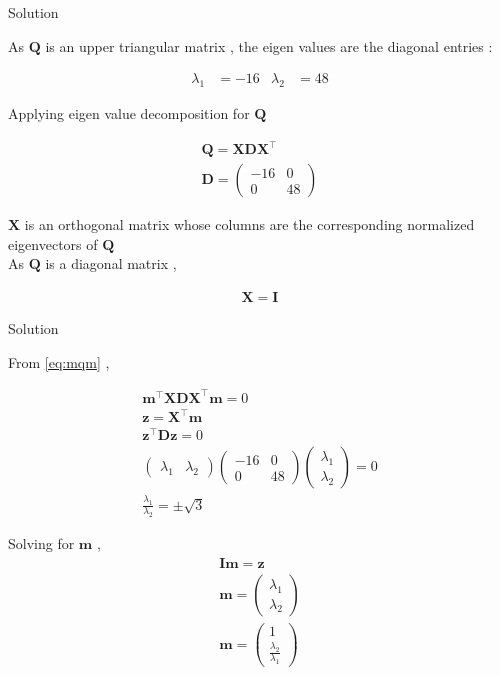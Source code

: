 \documentclass{beamer}
\numberwithin{equation}{section}
\theoremstyle{remark}
\newcommand{\myvec}[1]{\ensuremath{\begin{pmatrix}#1\end{pmatrix}}}
\let\vec\mathbf
\begin{document}
	\begin{frame}{Solution}
		
		As $\vec{Q}$ is an upper triangular matrix , the eigen values are the diagonal entries :
		
		\begin{align}
			\lambda_1 &= -16 & \lambda_2 &= 48
		\end{align}
		
		Applying eigen value decomposition for $\vec{Q}$ 
		
		\begin{align}
			\vec{Q} = \vec{X}\vec{D}\vec{X}^\top\\
			\vec{D} = \myvec{-16 & 0\\0 & 48}
		\end{align}
		
		$\vec{X}$ is an orthogonal matrix whose columns are the corresponding normalized eigenvectors of $\vec{Q}$\\
		As $\vec{Q}$ is a diagonal matrix , 
		
		\begin{align}
			\vec{X} = \vec{I}
		\end{align}
		
	\end{frame}
	
	\begin{frame}{Solution}
		
		From \eqref{eq:mqm} ,
		
		\begin{align}
			\vec{m}^\top\vec{X}\vec{D}\vec{X}^\top\vec{m} = 0\\
			\vec{z} = \vec{X}^\top\vec{m}\\
			\vec{z}^\top\vec{D}\vec{z} = 0\\
			\myvec{\lambda_1 & \lambda_2}\myvec{-16 & 0\\0 & 48}\myvec{\lambda_1\\\lambda_2} = 0\\
			\frac{\lambda_1}{\lambda_2} = \pm \sqrt{3} \label{eq:z} 
		\end{align}
		
		Solving for $\vec{m}$ ,
		\begin{align}
			\vec{I}\vec{m} = \vec{z}\\
			\vec{m} = \myvec{\lambda_1\\\lambda_2}\\
			\vec{m} = \myvec{1\\\tfrac{\lambda_2}{\lambda_1}}
		\end{align}
		
	\end{frame}
	
\end{document}
